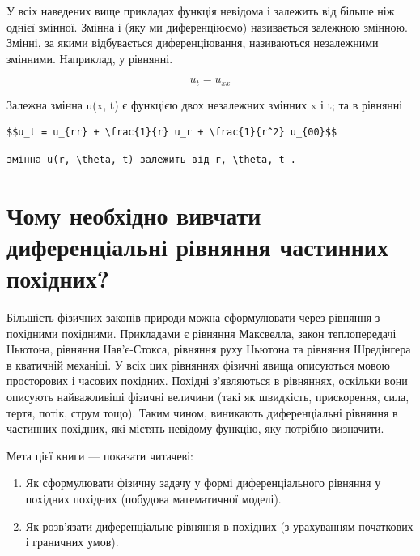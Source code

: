 \documentclass[
  ukrainian,
]{article}
\begin{document}
У всіх наведених вище прикладах функція невідома і залежить від більше
ніж однієї змінної. Змінна і (яку ми диференціюємо) називається залежною
змінною. Змінні, за якими відбувається диференціювання, називаються
незалежними змінними. Наприклад, у рівнянні.

\[u_t = u_{xx}\]

Залежна змінна u(x, t) є функцією двох незалежних змінних x і t; та в
рівнянні

\begin{verbatim}
$$u_t = u_{rr} + \frac{1}{r} u_r + \frac{1}{r^2} u_{00}$$
\end{verbatim}

\begin{verbatim}
змінна u(r, \theta, t) залежить від r, \theta, t .
\end{verbatim}

\section{Чому необхідно вивчати диференціальні рівняння частинних
похідних?}\label{ux447ux43eux43cux443-ux43dux435ux43eux431ux445ux456ux434ux43dux43e-ux432ux438ux432ux447ux430ux442ux438-ux434ux438ux444ux435ux440ux435ux43dux446ux456ux430ux43bux44cux43dux456-ux440ux456ux432ux43dux44fux43dux43dux44f-ux447ux430ux441ux442ux438ux43dux43dux438ux445-ux43fux43eux445ux456ux434ux43dux438ux445}

Більшість фізичних законів природи можна сформулювати через рівняння з
похідними похідними. Прикладами є рівняння Максвелла, закон
теплопередачі Ньютона, рівняння Нав'є-Стокса, рівняння руху Ньютона та
рівняння Шредінгера в кватичній механіці. У всіх цих рівняннях фізичні
явища описуються мовою просторових і часових похідних. Похідні
з'являються в рівняннях, оскільки вони описують найважливіші фізичні
величини (такі як швидкість, прискорення, сила, тертя, потік, струм
тощо). Таким чином, виникають диференціальні рівняння в частинних
похідних, які містять невідому функцію, яку потрібно визначити.

Мета цієї книги --- показати читачеві:

\begin{enumerate}
\def\labelenumi{\arabic{enumi}.}
\item
  Як сформулювати фізичну задачу у формі диференціального рівняння у
  похідних похідних (побудова математичної моделі).
\item
  Як розв'язати диференціальне рівняння в похідних (з урахуванням
  початкових і граничних умов).
\end{enumerate}
\end{document}
